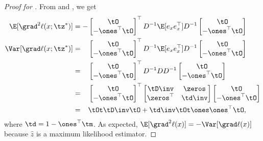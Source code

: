 \begin{proof}[Proof for ]
From  and , we get
  \begin{align*}
    \E[\grad^2 \ell(x; \tz^*)] 
    &= -
        \begin{bmatrix}
          \tO \\
          -\ones^\top \tO
        \end{bmatrix}^\top
          D^{-1} \E[e_x e_x^\top] D^{-1} 
        \begin{bmatrix}
          \tO \\
          -\ones^\top \tO
        \end{bmatrix} \\
    \Var [\grad \ell(x; \tz^*)] 
    &= \hphantom{-}
        \begin{bmatrix}
          \tO \\
          -\ones^\top \tO
        \end{bmatrix}^\top
          D^{-1} \E[e_x e_x^\top] D^{-1} 
        \begin{bmatrix}
          \tO \\
          -\ones^\top \tO
        \end{bmatrix} \\
    &= \hphantom{-}
        \begin{bmatrix}
          \tO \\
          -\ones^\top \tO
        \end{bmatrix}^\top
          D^{-1} D D^{-1} 
        \begin{bmatrix}
          \tO \\
          -\ones^\top \tO
        \end{bmatrix} \\
    &= \hphantom{-}
        \begin{bmatrix}
          \tO \\
          - \ones^\top \tO
        \end{bmatrix}^\top
        \begin{bmatrix}
          \tD\inv & \zeros \\
          \zeros^\top & \td\inv
        \end{bmatrix}
        \begin{bmatrix}
          \tO \\
          - \ones^\top \tO
        \end{bmatrix} \\
        &= \hphantom{-} \tOt \tD\inv \tO + \td\inv \tOt \ones \ones^\top \tO,
  \end{align*}
where $\td = 1 - \ones^\top \tm$.
As expected, $\E[\grad^2 \ell(x)] = -\Var [\grad \ell(x)]$ because
$\hat{z}$ is a maximum likelihood estimator. 


\end{proof}
